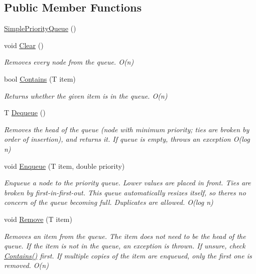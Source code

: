 \subsection*{Public Member Functions}
\begin{DoxyCompactItemize}
\item 
\hyperlink{class_priority___queue_1_1_simple_priority_queue_a4f0f5f2a811fdda31dedffffbaf6407f}{Simple\+Priority\+Queue} ()
\item 
void \hyperlink{class_priority___queue_1_1_simple_priority_queue_a23b62d7c0a813de7136c48396f2e936c}{Clear} ()
\begin{DoxyCompactList}\small\item\em Removes every node from the queue. O(n) \end{DoxyCompactList}\item 
bool \hyperlink{class_priority___queue_1_1_simple_priority_queue_a7c557aba4037622190880b129a0ee7dd}{Contains} (T item)
\begin{DoxyCompactList}\small\item\em Returns whether the given item is in the queue. O(n) \end{DoxyCompactList}\item 
T \hyperlink{class_priority___queue_1_1_simple_priority_queue_ad17b59ab99b074c9f697fee41b7583c3}{Dequeue} ()
\begin{DoxyCompactList}\small\item\em Removes the head of the queue (node with minimum priority; ties are broken by order of insertion), and returns it. If queue is empty, throws an exception O(log n) \end{DoxyCompactList}\item 
void \hyperlink{class_priority___queue_1_1_simple_priority_queue_a7f24aa70888f2509f9ec9f714619a075}{Enqueue} (T item, double priority)
\begin{DoxyCompactList}\small\item\em Enqueue a node to the priority queue. Lower values are placed in front. Ties are broken by first-\/in-\/first-\/out. This queue automatically resizes itself, so there\textquotesingle{}s no concern of the queue becoming \textquotesingle{}full\textquotesingle{}. Duplicates are allowed. O(log n) \end{DoxyCompactList}\item 
void \hyperlink{class_priority___queue_1_1_simple_priority_queue_a16f1802e80604982bd76fef639f271e8}{Remove} (T item)
\begin{DoxyCompactList}\small\item\em Removes an item from the queue. The item does not need to be the head of the queue. If the item is not in the queue, an exception is thrown. If unsure, check \hyperlink{class_priority___queue_1_1_simple_priority_queue_a7c557aba4037622190880b129a0ee7dd}{Contains()} first. If multiple copies of the item are enqueued, only the first one is removed. O(n) \end{DoxyCompactList}\item 

\end{DoxyCompactItemize}
